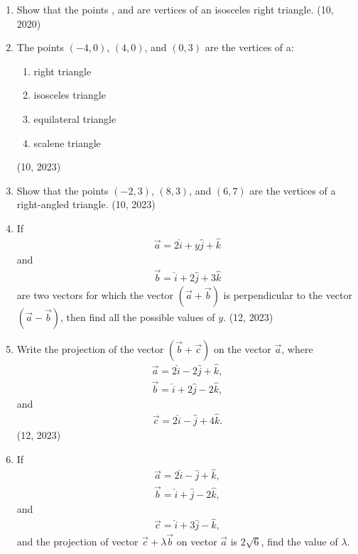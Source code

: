 \begin{enumerate}[label=\thesubsection.\arabic*, ref=\thesubsection.\theenumi]
\item Show that the points ,  and  are vertices of an isosceles right triangle.
\hfill (10, 2020)
    \item The points $(-4,0)$, $(4,0)$, and $(0,3)$ are the vertices of a:
    \begin{enumerate}
        \item right triangle
        \item isosceles triangle
        \item equilateral triangle
        \item scalene triangle
    \end{enumerate}
    \hfill (10, 2023)
    \item Show that the points $(-2,3)$, $(8,3)$, and $(6,7)$ are the vertices of a right-angled triangle.
    \hfill (10, 2023)
    \item If
    \begin{align*}
        \overrightarrow{a} = 2\hat{i} + y\hat{j} + \hat{k}
    \end{align*}
    and
    \begin{align*}
        \overrightarrow{b} = \hat{i} + 2\hat{j} + 3\hat{k}
    \end{align*}
    are two vectors for which the vector $(\overrightarrow{a} + \overrightarrow{b})$ is perpendicular to the vector $(\overrightarrow{a} - \overrightarrow{b})$, then find all the possible values of $y$.
    \hfill (12, 2023)
    \item Write the projection of the vector $(\overrightarrow{b} + \overrightarrow{c})$ on the vector $\overrightarrow{a}$, where
    \begin{align*}
        \overrightarrow{a} = 2\hat{i} - 2\hat{j} + \hat{k},
    \end{align*}
    \begin{align*}
        \overrightarrow{b} = \hat{i} + 2\hat{j} - 2\hat{k},
    \end{align*}
    and
    \begin{align*}
        \overrightarrow{c} = 2\hat{i} - \hat{j} + 4\hat{k}.
    \end{align*}
    \hfill (12, 2023)

    \item If
    \begin{align*}
        \overrightarrow{a} = 2\hat{i} - \hat{j} + \hat{k},
    \end{align*}
    \begin{align*}
        \overrightarrow{b} = \hat{i} + \hat{j} - 2\hat{k},
    \end{align*}
    and
    \begin{align*}
        \overrightarrow{c} = \hat{i} + 3\hat{j} - \hat{k},
    \end{align*}
    and the projection of vector $\overrightarrow{c} + \lambda \overrightarrow{b}$ on vector $\overrightarrow{a}$ is $2\sqrt{6}$, find the value of $\lambda$.


\end{enumerate}
